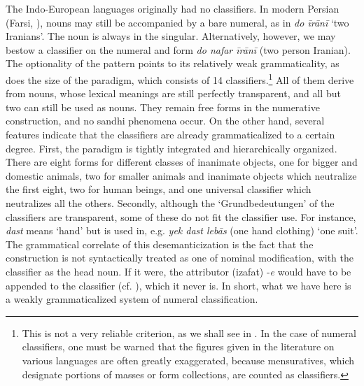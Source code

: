 The Indo-European languages originally had no classifiers. In modern Persian (Farsi, \citealt{Moinfar1980}), nouns may still be accompanied by a bare numeral, as in \textit{do \=ir\=an\=i} `two Iranians'. The noun is always in the singular. Alternatively, however, we may bestow a classifier on the numeral and form \textit{do nafar \=ir\=an\=i} (two person Iranian). The optionality of the pattern points to its relatively weak grammaticality, as does the size of the paradigm, which consists of 14 classifiers.\footnote{This is not a very reliable criterion, as we shall see in . In the case of numeral classifiers, one must be warned that the figures given in the literature on various languages are often greatly exaggerated, because mensuratives, which designate portions of masses or form collections, are counted as classifiers.} All of them derive from nouns, whose lexical meanings are still perfectly transparent, and all but two can still be used as nouns. They remain free forms in the numerative construction, and no sandhi phenomena occur. On the other hand, several features indicate that the classifiers are already grammaticalized to a certain degree. First, the paradigm is tightly integrated and hierarchically organized. There are eight forms for different classes of inanimate objects, one for bigger and domestic animals, two for smaller animals and inanimate objects which neutralize the first eight, two for human beings, and one universal classifier which neutralizes all the others. Secondly, although the ‘Grundbedeutungen’ of the classifiers are transparent, some of these do not fit the classifier use. For instance, \textit{dast} means ‘hand’ but is used in, e.g. \textit{yek dast leb\=as} (one hand clothing) ‘one suit’. The grammatical correlate of this desemanticization is the fact that the construction is not syntactically treated as one of nominal modification, with the classifier as the head noun. If it were, the attributor (izafat) -\textit{e} would have to be appended to the classifier (cf. ), which it never is. In short, what we have here is a weakly grammaticalized system of numeral classification.

